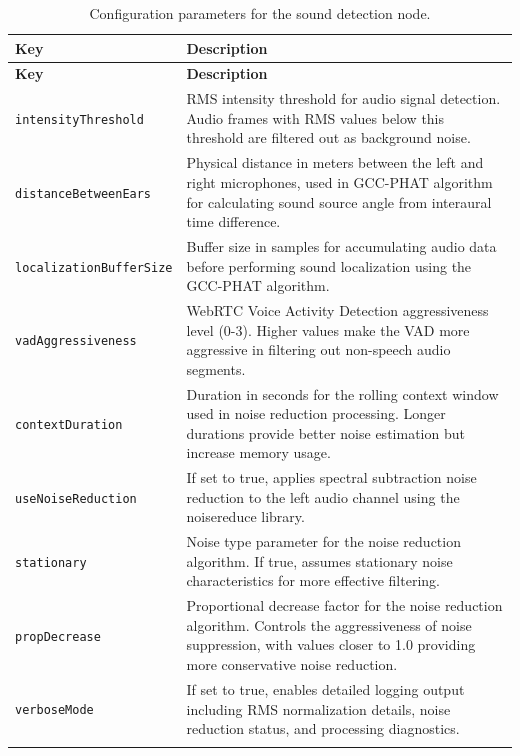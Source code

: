 \documentclass{CSSRforAfrica}
\begin{document}
\begin{longtable}{| l | p{10.5cm} |}
	\hline
	\rowcolor{blue!20}
	\textbf{Key} & \textbf{Description} \\
	\hline
	\endfirsthead
	
	\hline
	\rowcolor{blue!20}
	\textbf{Key} & \textbf{Description} \\
	\hline
	\endhead
	
	\texttt{intensityThreshold} & RMS intensity threshold for audio signal detection. Audio frames with RMS values below this threshold are filtered out as background noise. \\
	\hline
	\texttt{distanceBetweenEars} & Physical distance in meters between the left and right microphones, used in GCC-PHAT algorithm for calculating sound source angle from interaural time difference. \\
	\hline
	\texttt{localizationBufferSize} & Buffer size in samples for accumulating audio data before performing sound localization using the GCC-PHAT algorithm. \\
	\hline
	\texttt{vadAggressiveness} & WebRTC Voice Activity Detection aggressiveness level (0-3). Higher values make the VAD more aggressive in filtering out non-speech audio segments. \\
	\hline
	\texttt{contextDuration} & Duration in seconds for the rolling context window used in noise reduction processing. Longer durations provide better noise estimation but increase memory usage. \\
	\hline
	\texttt{useNoiseReduction} & If set to true, applies spectral subtraction noise reduction to the left audio channel using the noisereduce library. \\
	\hline
	\texttt{stationary} & Noise type parameter for the noise reduction algorithm. If true, assumes stationary noise characteristics for more effective filtering. \\
	\hline
	\texttt{propDecrease} & Proportional decrease factor for the noise reduction algorithm. Controls the aggressiveness of noise suppression, with values closer to 1.0 providing more conservative noise reduction. \\
	\hline
	\texttt{verboseMode} & If set to true, enables detailed logging output including RMS normalization details, noise reduction status, and processing diagnostics. \\
	\hline
	
	\caption{Configuration parameters for the sound detection node.}
	\label{tab:sound_detection_config}
\end{longtable}
\end{document}
